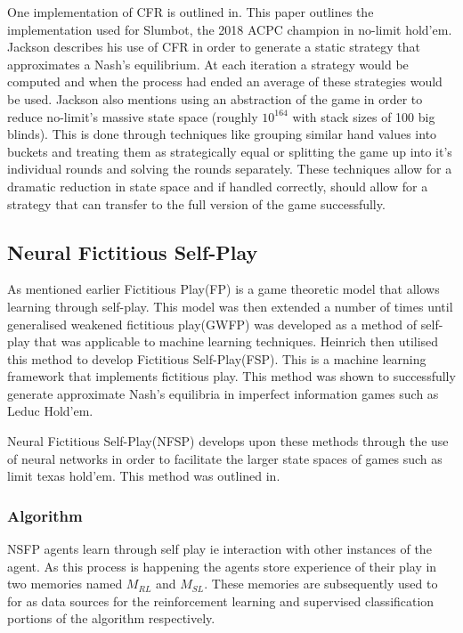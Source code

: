 One implementation of CFR is outlined in\citep{jackson2013slumbot}.
This paper outlines the implementation used for Slumbot, the 2018 ACPC champion 
in no-limit hold'em.
Jackson describes his use of CFR in order to generate a static strategy that approximates
a Nash's equilibrium.
At each iteration a strategy would be computed and when the process had ended an 
average of these strategies would be used.
Jackson also mentions using an abstraction of the game in order to reduce no-limit's 
massive state space (roughly $10^{164}$ with stack sizes of 100 big blinds)\citep{johanson2013measuring}.
This is done through techniques like grouping similar hand values into buckets and 
treating them as strategically equal or splitting the game up into it's individual rounds 
and solving the rounds separately.
These techniques allow for a dramatic reduction in state space and if handled correctly, 
should allow for a strategy that can transfer to the full version of the game successfully.


\subsection{Neural Fictitious Self-Play}\label{subsec:thNFSP}
As mentioned earlier Fictitious Play(FP) is a game theoretic model that allows learning through self-play.
This model was then extended a number of times until generalised weakened fictitious play(GWFP) was developed as a
method of self-play that was applicable to machine learning techniques.
Heinrich then utilised this method to develop Fictitious Self-Play(FSP)\cite{heinrich2015fictitious}.
This is a machine learning framework that implements fictitious play.
This method was shown to successfully generate approximate Nash's equilibria in imperfect information games
such as Leduc Hold'em.

Neural Fictitious Self-Play(NFSP) develops upon these methods through the use of neural
networks in order to facilitate the larger state spaces of games such as limit texas hold'em.
This method was outlined in\cite{heinrich2016deep}.

\subsubsection{Algorithm}
NSFP agents learn through self play ie interaction with other instances of the agent.
As this process is happening the agents store experience of their play in two memories
named $M_{RL}$ and $M_{SL}$.
These memories are subsequently used to for as data sources for the reinforcement learning and
supervised classification portions of the algorithm respectively.

